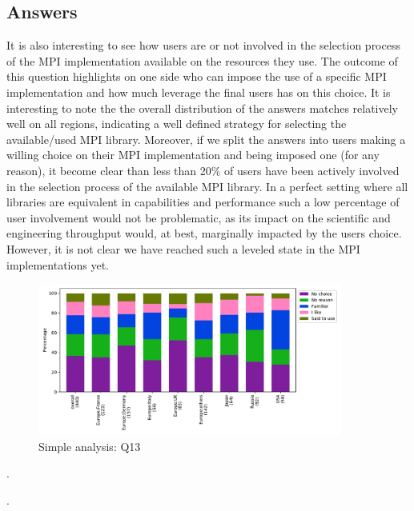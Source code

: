 
\subsection{Answers}


It is also interesting to see how users are or not involved in the selection process of the MPI implementation available on the resources they use. The outcome of this question highlights on one side who can impose the use of a specific MPI implementation and how much leverage the final users has on this choice. It is interesting to note the the overall distribution of the answers matches relatively well on all regions, indicating a well defined strategy for selecting the available/used MPI library. Moreover, if we split the answers into users making a willing choice on their MPI implementation and being imposed one (for any reason), it become clear than less than 20\% of users have been actively involved in the selection process of the available MPI library.
%
In a perfect setting where all libraries are equivalent in capabilities and performance such a low percentage of user involvement would not be problematic, as its impact on the scientific and engineering throughput would, at best, marginally impacted by the users choice. However, it is not clear we have reached such a leveled state in the MPI implementations yet.

\begin{figure}[htb]
\begin{center}
\includegraphics[width=10cm]{../pdfs/Q13.pdf}
\caption{Simple analysis: Q13}
\label{fig:Q13}
\end{center}
\end{figure}

.

.
